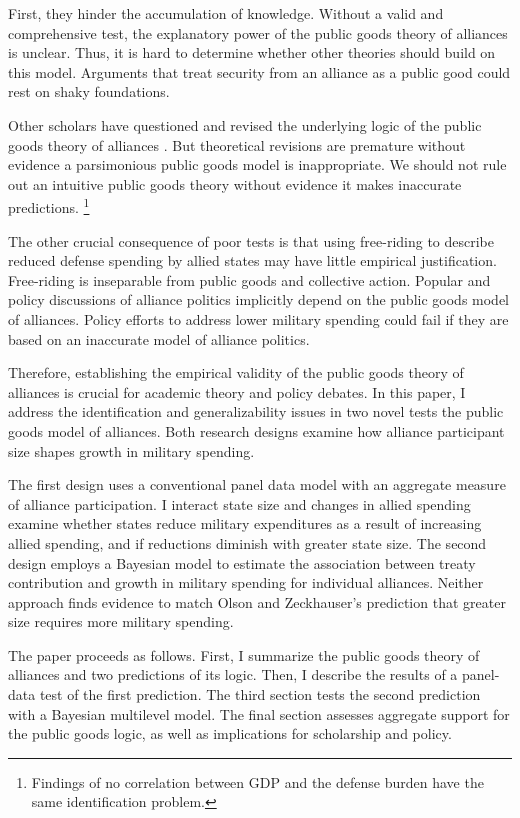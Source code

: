 \documentclass[12pt]{article}
\begin{document}
 
First, they hinder the accumulation of knowledge. 
Without a valid and comprehensive test, the explanatory power of the public goods theory of alliances is unclear. 
Thus, it is hard to determine whether other theories should build on this model. 
Arguments that treat security from an alliance as a public good could rest on shaky foundations. 


Other scholars have questioned and revised the underlying logic of the public goods theory of alliances \citep{Palmer1990, SandlerHartley2001}.  
But theoretical revisions are premature without evidence a parsimonious public goods model is inappropriate. 
We should not rule out an intuitive public goods theory without evidence it makes inaccurate predictions.
\footnote{Findings of no correlation between GDP and the defense burden have the same identification problem.} 


The other crucial consequence of poor tests is that using free-riding to describe reduced defense spending by allied states may have little empirical justification. 
Free-riding is inseparable from public goods and collective action. 
Popular and policy discussions of alliance politics implicitly depend on the public goods model of alliances. 
Policy efforts to address lower military spending could fail if they are based on an inaccurate model of alliance politics. 


Therefore, establishing the empirical validity of the public goods theory of alliances is crucial for academic theory and policy debates.
In this paper, I address the identification and generalizability issues in two novel tests the public goods model of alliances.  
Both research designs examine how alliance participant size shapes growth in military spending. 


The first design uses a conventional panel data model with an aggregate measure of alliance participation. 
I interact state size and changes in allied spending examine whether states reduce military expenditures as a result of increasing allied spending, and if reductions diminish with greater state size. 
The second design employs a Bayesian model to estimate the association between treaty contribution and growth in military spending for individual alliances. 
Neither approach finds evidence to match Olson and Zeckhauser's prediction that greater size requires more military spending. 


The paper proceeds as follows.
First, I summarize the public goods theory of alliances and two predictions of its logic.
Then, I describe the results of a panel-data test of the first prediction.
The third section tests the second prediction with a Bayesian multilevel model. 
The final section assesses aggregate support for the public goods logic, as well as implications for scholarship and policy. 
\end{document}
